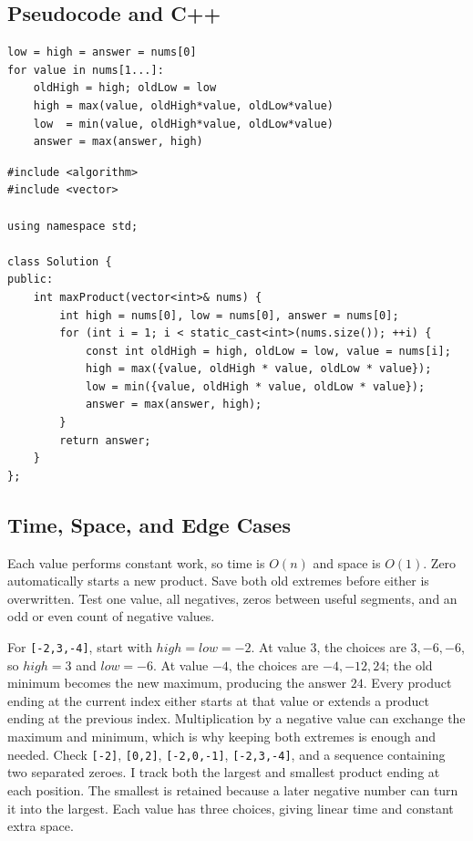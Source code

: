 \subsection{Pseudocode and C++}
\begin{lstlisting}[style=pseudocode]
low = high = answer = nums[0]
for value in nums[1...]:
    oldHigh = high; oldLow = low
    high = max(value, oldHigh*value, oldLow*value)
    low  = min(value, oldHigh*value, oldLow*value)
    answer = max(answer, high)
\end{lstlisting}

\begin{lstlisting}[style=compactcode,caption={Complete C++ solution: Maximum Product Subarray}]
#include <algorithm>
#include <vector>

using namespace std;

class Solution {
public:
    int maxProduct(vector<int>& nums) {
        int high = nums[0], low = nums[0], answer = nums[0];
        for (int i = 1; i < static_cast<int>(nums.size()); ++i) {
            const int oldHigh = high, oldLow = low, value = nums[i];
            high = max({value, oldHigh * value, oldLow * value});
            low = min({value, oldHigh * value, oldLow * value});
            answer = max(answer, high);
        }
        return answer;
    }
};
\end{lstlisting}

\subsection{Time, Space, and Edge Cases}
Each value performs constant work, so time is \(O(n)\) and space is \(O(1)\).
Zero automatically starts a new product. Save both old extremes before either
is overwritten. Test one value, all negatives, zeros between useful segments,
and an odd or even count of negative values.

\lessonexpansion
  {For \texttt{[-2,3,-4]}, start with \(high=low=-2\). At value 3, the
   choices are \(3,-6,-6\), so \(high=3\) and \(low=-6\). At value
   \(-4\), the choices are \(-4,-12,24\); the old minimum becomes the new
   maximum, producing the answer \(24\).}
  {Every product ending at the current index either starts at that value or
   extends a product ending at the previous index. Multiplication by a
   negative value can exchange the maximum and minimum, which is why keeping
   both extremes is enough and needed.}
  {Check \texttt{[-2]}, \texttt{[0,2]}, \texttt{[-2,0,-1]},
   \texttt{[-2,3,-4]}, and a sequence containing two separated zeroes.}
  {I track both the largest and smallest product ending at each position.
   The smallest is retained because a later negative number can turn it into
   the largest. Each value has three choices, giving linear time and
   constant extra space.}

